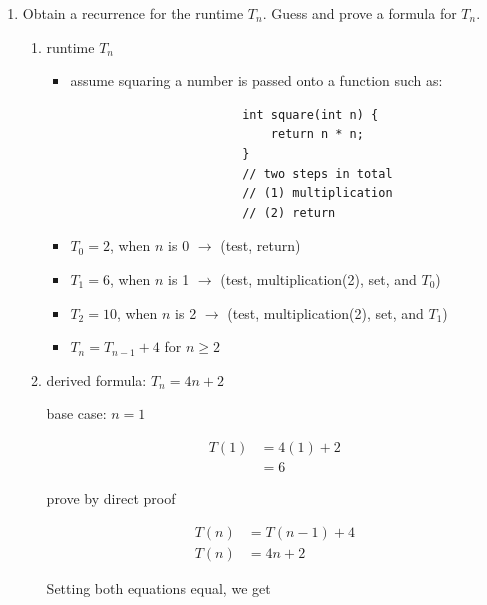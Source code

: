 \documentclass{article}
\begin{document}
\begin{itemize}
\begin{enumerate}[label=(\alph*)]
\begin{enumerate}[label=(\roman*)]
            \end{enumerate}
            \item Obtain a recurrence for the runtime $T_n$. Guess and prove a formula for $T_n$.
            \begin{enumerate}[label=(\roman*)]
                \item runtime $T_n$
                \begin{itemize}[label=$\bullet$]
                    \item assume squaring a number is passed onto a function such as:
                    \begin{verbatim}
                        int square(int n) {
                            return n * n;
                        }
                        // two steps in total 
                        // (1) multiplication 
                        // (2) return
                    \end{verbatim}
                    \item $T_0 = 2$, when $n$ is 0 $\rightarrow$ (test, return)
                    \item $T_1 = 6$, when $n$ is 1 $\rightarrow$ (test, multiplication(2), set, and $T_0$)
                    \item $T_2 = 10$, when $n$ is 2 $\rightarrow$ (test, multiplication(2), set, and $T_1$)
                    \item $T_n = T_{n-1} + 4$ for $n \geq 2$ 
                \end{itemize}
                \item derived formula: $T_n = 4n + 2$
                \begin{center}
                    base case: $n=1$
                \end{center}
                \begin{align*}
                    T(1) &= 4(1) + 2\\
                         &= 6
                \end{align*}
                \begin{center}
                    prove by direct proof
                \end{center}
                \begin{align*}
                    T(n) &= T(n-1) + 4\\
                    T(n) &= 4n + 2
                \end{align*}
                \begin{center}
                    Setting both equations equal, we get

\end{center}
\end{enumerate}
\end{enumerate}
\end{itemize}
\end{document}
